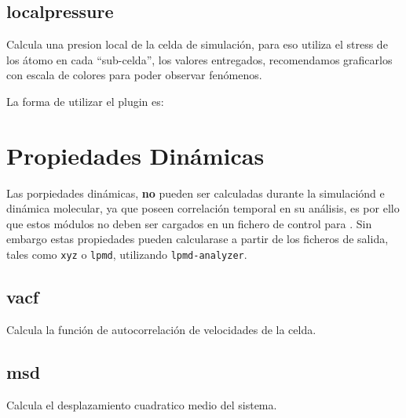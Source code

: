 \subsection{localpressure}

Calcula una presion local de la celda de simulaci\'on, para eso utiliza el stress de los \'atomo en cada ``sub-celda'', los valores entregados, recomendamos graficarlos con escala de colores para poder observar fen\'omenos. 

La forma de utilizar el plugin es:


\section{Propiedades Din\'amicas}
Las porpiedades din\'amicas, \textbf{no} pueden ser calculadas durante la simulaci\'ond e din\'amica molecular, ya que poseen correlaci\'on temporal en su an\'alisis, es por ello que estos m\'odulos no deben ser cargados en un fichero de control para \lpmd. Sin embargo estas propiedades pueden calcularase a partir de los ficheros de salida, tales como \verb|xyz| o \verb|lpmd|, utilizando \verb|lpmd-analyzer|.
\subsection{vacf}
Calcula la funci\'on de autocorrelaci\'on de velocidades de la celda.
\subsection{msd}
Calcula el desplazamiento cuadratico medio del sistema.
